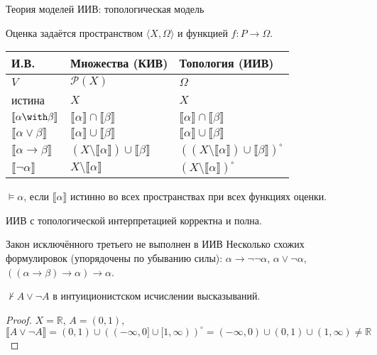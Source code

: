 \documentclass[aspectratio=169]{beamer}
\begin{document}
\begin{frame}{Теория моделей ИИВ: топологическая модель}

Оценка задаётся пространством $\langle X, \Omega \rangle$ и функцией $f : P \rightarrow \Omega$.

\begin{center}\begin{tabular}{lll} 
 И.В. & Множества (КИВ) & Топология (ИИВ) \\\hline
 $V$ & $\mathcal{P}(X)$ & $\Omega$ \\
 истина & $X$ & $X$\\
 $\llbracket \alpha \with \beta \rrbracket$  & $\llbracket \alpha \rrbracket \cap \llbracket \beta \rrbracket$  & $\llbracket \alpha \rrbracket \cap \llbracket \beta \rrbracket$\\
 $\llbracket \alpha \vee \beta \rrbracket$ & $\llbracket \alpha \rrbracket \cup \llbracket \beta \rrbracket$ & $\llbracket \alpha \rrbracket \cup \llbracket \beta \rrbracket$\\
 $\llbracket \alpha \rightarrow \beta \rrbracket$ & $(X \setminus \llbracket \alpha \rrbracket) \cup \llbracket \beta \rrbracket$ &  $((X \setminus \llbracket \alpha \rrbracket) \cup \llbracket \beta \rrbracket)^\circ$\\
 $\llbracket \neg\alpha \rrbracket$ & $X \setminus \llbracket \alpha \rrbracket$ & $(X \setminus \llbracket \alpha \rrbracket)^\circ$\\
\end{tabular}\end{center}

\begin{defrus}$\models \alpha$, если $\llbracket\alpha\rrbracket$ истинно во всех пространствах при всех функциях оценки.\end{defrus}

\begin{thmrus}ИИВ с топологической интерпретацией корректна и полна.\end{thmrus}
\end{frame}

\begin{frame}{Закон исключённого третьего не выполнен в ИИВ}
Несколько схожих формулировок (упорядочены по убыванию силы): $\alpha \rightarrow \neg\neg \alpha$, $\alpha \vee \neg\alpha$, $((\alpha\rightarrow\beta)\rightarrow\alpha)\rightarrow\alpha$.

\begin{thmrus}$\not\vdash A \vee \neg A$ в интуиционистском исчислении высказываний.
\end{thmrus}
\begin{proof}
$X = \mathbb{R}$, $A = (0,1)$, $\llbracket A \vee \neg A \rrbracket = (0,1)\cup((-\infty,0]\cup[1,\infty))^\circ = (-\infty,0)\cup(0,1)\cup(1,\infty) \ne \mathbb{R}$
\end{proof}

\end{frame}
\end{document}
